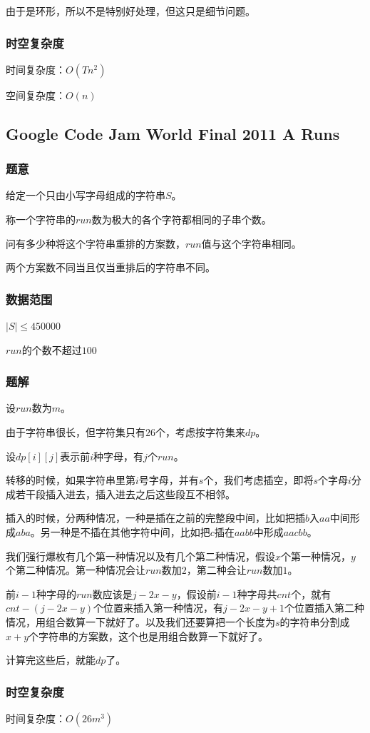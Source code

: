 \documentclass{ctexart}
\begin{document}
由于是环形，所以不是特别好处理，但这只是细节问题。
\subsubsection{时空复杂度}
时间复杂度：$O(Tn^2)$

空间复杂度：$O(n)$
\subsection{Google Code Jam World Final 2011 A Runs}
\subsubsection{题意}
给定一个只由小写字母组成的字符串$S$。

称一个字符串的$run$数为极大的各个字符都相同的子串个数。

问有多少种将这个字符串重排的方案数，$run$值与这个字符串相同。

两个方案数不同当且仅当重排后的字符串不同。
\subsubsection{数据范围}
$|S| \le 450000$

$run$的个数不超过$100$
\subsubsection{题解}
设$run$数为$m$。

由于字符串很长，但字符集只有$26$个，考虑按字符集来$dp$。

设$dp[i][j]$表示前$i$种字母，有$j$个$run$。

转移的时候，如果字符串里第$i$号字母，并有$s$个，我们考虑插空，即将$s$个字母$i$分成若干段插入进去，插入进去之后这些段互不相邻。

插入的时候，分两种情况，一种是插在之前的完整段中间，比如把插$b$入$aa$中间形成$aba$。另一种是不插在其他字符中间，比如把$c$插在$aabb$中形成$aacbb$。

我们强行爆枚有几个第一种情况以及有几个第二种情况，假设$x$个第一种情况，$y$个第二种情况。第一种情况会让$run$数加$2$，第二种会让$run$数加$1$。

前$i-1$种字母的$run$数应该是$j-2x-y$，假设前$i-1$种字母共$cnt$个，就有$cnt-(j-2x-y)$个位置来插入第一种情况，有$j-2x-y+1$个位置插入第二种情况，用组合数算一下就好了。以及我们还要算把一个长度为$s$的字符串分割成$x+y$个字符串的方案数，这个也是用组合数算一下就好了。

计算完这些后，就能$dp$了。
\subsubsection{时空复杂度}
时间复杂度：$O(26m^3)$
\end{document}
